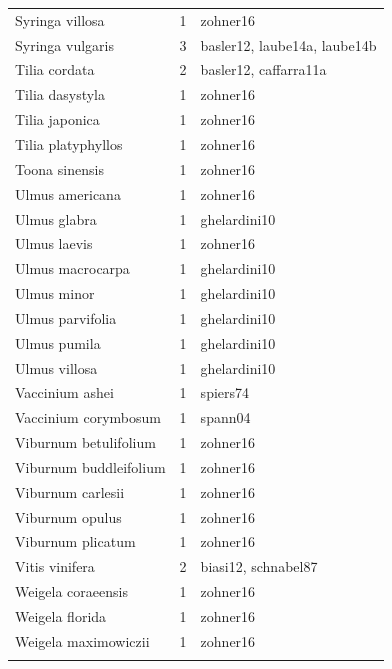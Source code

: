 \documentclass{article}
\begin{document}
\begin{footnotesize}
\begin{longtable}{|p{}|p{}|p{}|}
  Syringa villosa &   1 & zohner16 \\ 
  Syringa vulgaris &   3 & basler12, laube14a, laube14b \\ 
  Tilia cordata &   2 & basler12, caffarra11a \\ 
  Tilia dasystyla &   1 & zohner16 \\ 
  Tilia japonica &   1 & zohner16 \\ 
  Tilia platyphyllos &   1 & zohner16 \\ 
  Toona sinensis &   1 & zohner16 \\ 
  Ulmus americana &   1 & zohner16 \\ 
  Ulmus glabra &   1 & ghelardini10 \\ 
  Ulmus laevis &   1 & zohner16 \\ 
  Ulmus macrocarpa &   1 & ghelardini10 \\ 
  Ulmus minor &   1 & ghelardini10 \\ 
  Ulmus parvifolia &   1 & ghelardini10 \\ 
  Ulmus pumila &   1 & ghelardini10 \\ 
  Ulmus villosa &   1 & ghelardini10 \\ 
  Vaccinium ashei &   1 & spiers74 \\ 
  Vaccinium corymbosum &   1 & spann04 \\ 
  Viburnum betulifolium &   1 & zohner16 \\ 
  Viburnum buddleifolium &   1 & zohner16 \\ 
  Viburnum carlesii &   1 & zohner16 \\ 
  Viburnum opulus &   1 & zohner16 \\ 
  Viburnum plicatum &   1 & zohner16 \\ 
  Vitis vinifera &   2 & biasi12, schnabel87 \\ 
  Weigela coraeensis &   1 & zohner16 \\ 
  Weigela florida &   1 & zohner16 \\ 
  Weigela maximowiczii &   1 & zohner16 \\ 
   \hline
\hline
\label{tab:sp}
\end{longtable}
\endgroup



\end{footnotesize}
\end{document}
